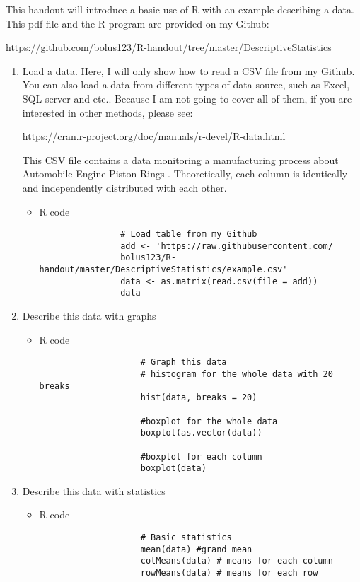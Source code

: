 This handout will introduce a basic use of R with an example describing a data. This pdf file and the R program are provided on my Github: \par\href{url}{https://github.com/bolus123/R-handout/tree/master/DescriptiveStatistics}
\begin{enumerate}
	\item Load a data. Here, I will only show how to read a CSV file from my Github. You can also load a data from different types of data source, such as Excel, SQL server and etc.. Because I am not going to cover all of them, if you are interested in other methods, please see:
	\par \href{url}{https://cran.r-project.org/doc/manuals/r-devel/R-data.html} 
	\par This CSV file contains a data monitoring a manufacturing process about Automobile Engine Piston Rings \cite{Montgomery09}. Theoretically, each column is identically and independently distributed with each other.
		\begin{itemize}
			\item R code
				\begin{verbatim}
				# Load table from my Github
				add <- 'https://raw.githubusercontent.com/
				bolus123/R-handout/master/DescriptiveStatistics/example.csv'
				data <- as.matrix(read.csv(file = add))
				data
				\end{verbatim}
		\end{itemize}		
	\item Describe this data with graphs
		\begin{itemize}
			\item R code
				\begin{verbatim}
				 	# Graph this data
				 	# histogram for the whole data with 20 breaks
				 	hist(data, breaks = 20) 
				 	
				 	#boxplot for the whole data
				 	boxplot(as.vector(data)) 
				 	
				 	#boxplot for each column
				 	boxplot(data) 
				\end{verbatim}
		\end{itemize}
	\item Describe this data with statistics
		\begin{itemize}
			\item R code
				\begin{verbatim}
					# Basic statistics
					mean(data) #grand mean
					colMeans(data) # means for each column
					rowMeans(data) # means for each row
					

\end{verbatim}
\end{itemize}
\end{enumerate}
